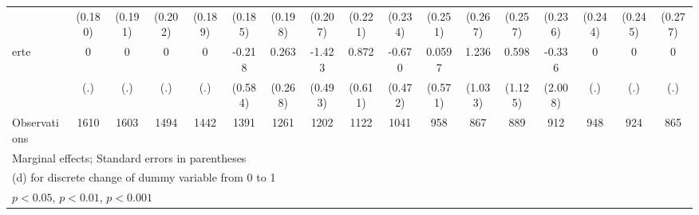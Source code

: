 {\begin{tabular}{l*{16}{c}}
                    &     (0.180)         &     (0.191)         &     (0.202)         &     (0.189)         &     (0.185)         &     (0.198)         &     (0.207)         &     (0.221)         &     (0.234)         &     (0.251)         &     (0.267)         &     (0.257)         &     (0.236)         &     (0.244)         &     (0.245)         &     (0.277)         \\
[1em]
erte                &           0         &           0         &           0         &           0         &      -0.218         &       0.263         &      -1.423\sym{**} &       0.872         &      -0.670         &      0.0597         &       1.236         &       0.598         &      -0.336         &           0         &           0         &           0         \\
                    &         (.)         &         (.)         &         (.)         &         (.)         &     (0.584)         &     (0.268)         &     (0.493)         &     (0.611)         &     (0.472)         &     (0.571)         &     (1.033)         &     (1.125)         &     (2.008)         &         (.)         &         (.)         &         (.)         \\
\hline
Observations        &        1610         &        1603         &        1494         &        1442         &        1391         &        1261         &        1202         &        1122         &        1041         &         958         &         867         &         889         &         912         &         948         &         924         &         865         \\
\hline\hline
\multicolumn{17}{l}{\footnotesize Marginal effects; Standard errors in parentheses}\\
\multicolumn{17}{l}{\footnotesize  (d) for discrete change of dummy variable from 0 to 1}\\
\multicolumn{17}{l}{\footnotesize \sym{*} \(p<0.05\), \sym{**} \(p<0.01\), \sym{***} \(p<0.001\)}\\
\end{tabular}
}

